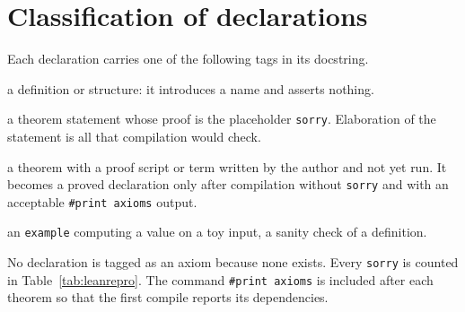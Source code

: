 \section{Classification of declarations}

Each declaration carries one of the following tags in its docstring.

\begin{description}[leftmargin=2.2cm,labelwidth=2cm,font=\normalfont\ttfamily]
\item[{[DEF]}] a definition or structure: it introduces a name and asserts nothing.
\item[{[STMT]}] a theorem statement whose proof is the placeholder \texttt{sorry}. Elaboration of the statement is all that compilation would check.
\item[{[PROOF-UNCHECKED]}] a theorem with a proof script or term written by the author and not yet run. It becomes a proved declaration only after compilation without \texttt{sorry} and with an acceptable \texttt{\#print axioms} output.
\item[{[DEF-CHECK]}] an \texttt{example} computing a value on a toy input, a sanity check of a definition.
\end{description}

No declaration is tagged as an axiom because none exists. Every \texttt{sorry} is counted in Table~\ref{tab:leanrepro}. The command \texttt{\#print axioms} is included after each theorem so that the first compile reports its dependencies.

